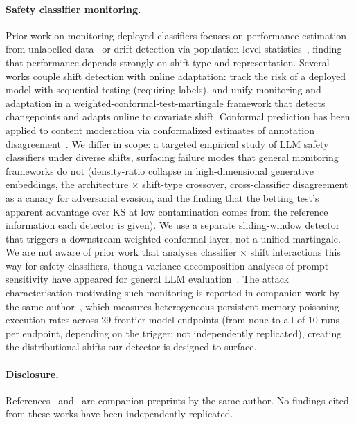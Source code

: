 \documentclass{article}
\begin{document}
\paragraph{Safety classifier monitoring.} Prior work on monitoring deployed classifiers focuses on performance estimation from unlabelled data~\citep{garg2022leveraging} or drift detection via population-level statistics~\citep{rabanser2019failing}, finding that performance depends strongly on shift type and representation. Several works couple shift detection with online adaptation: \citet{podkopaev2022tracking} track the risk of a deployed model with sequential testing (requiring labels), and \citet{prinster2025watch} unify monitoring and adaptation in a weighted-conformal-test-martingale framework that detects changepoints and adapts online to covariate shift. Conformal prediction has been applied to content moderation via conformalized estimates of annotation disagreement~\citep{villatecastillo2024moderation}. We differ in scope: a targeted empirical study of LLM safety classifiers under diverse shifts, surfacing failure modes that general monitoring frameworks do not (density-ratio collapse in high-dimensional generative embeddings, the architecture $\times$ shift-type crossover, cross-classifier disagreement as a canary for adversarial evasion, and the finding that the betting test's apparent advantage over KS at low contamination comes from the reference information each detector is given). We use a separate sliding-window detector that triggers a downstream weighted conformal layer, not a unified martingale. We are not aware of prior work that analyses classifier $\times$ shift interactions this way for safety classifiers, though variance-decomposition analyses of prompt sensitivity have appeared for general LLM evaluation~\citep{romanou2026brittlebench}. The attack characterisation motivating such monitoring is reported in companion work by the same author~\citep{leong2026agentic}, which measures heterogeneous persistent-memory-poisoning execution rates across 29 frontier-model endpoints (from none to all of 10 runs per endpoint, depending on the trigger; not independently replicated), creating the distributional shifts our detector is designed to surface.

\paragraph{Disclosure.} References~\citep{leong2026agentic} and~\citep{leong2026recognition} are companion preprints by the same author. No findings cited from these works have been independently replicated.
\end{document}
